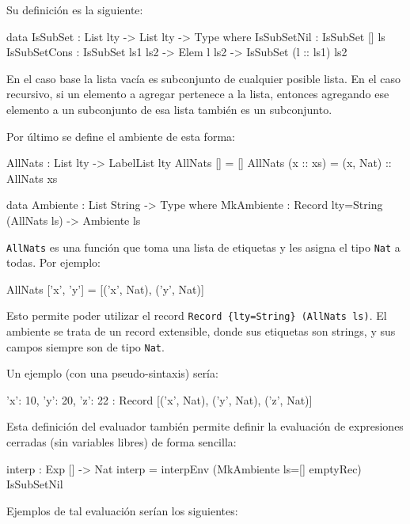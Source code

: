 Su definición es la siguiente:

\begin{code}
data IsSubSet : List lty -> List lty -> Type where
  IsSubSetNil : IsSubSet [] ls
  IsSubSetCons : IsSubSet ls1 ls2 -> Elem l ls2 -> 
    IsSubSet (l :: ls1) ls2
\end{code}

En el caso base la lista vacía es subconjunto de cualquier posible lista. En el caso recursivo, si un elemento a agregar pertenece a la lista, entonces agregando ese elemento a un subconjunto de esa lista también es un subconjunto.

Por último se define el ambiente de esta forma:

\begin{code}
AllNats : List lty -> LabelList lty
AllNats [] = []
AllNats (x :: xs) = (x, Nat) :: AllNats xs

data Ambiente : List String -> Type where
  MkAmbiente : Record {lty=String} (AllNats ls) -> Ambiente ls
\end{code}

\texttt{AllNats} es una función que toma una lista de etiquetas y les asigna el tipo \texttt{Nat} a todas. Por ejemplo:

\begin{code}
AllNats ['x', 'y'] = [('x', Nat), ('y', Nat)]
\end{code}

Esto permite poder utilizar el record \texttt{Record \{lty=String\} (AllNats ls)}. El ambiente se trata de un record extensible, donde sus etiquetas son strings, y sus campos siempre son de tipo \texttt{Nat}.

Un ejemplo (con una pseudo-sintaxis) sería:

\begin{code}
{ 'x': 10, 'y': 20, 'z': 22 } : 
  Record [('x', Nat), ('y', Nat), ('z', Nat)]
\end{code}

Esta definición del evaluador también permite definir la evaluación de expresiones cerradas (sin variables libres) de forma sencilla:

\begin {code}
interp : Exp [] -> Nat
interp = interpEnv (MkAmbiente {ls=[]} emptyRec) IsSubSetNil
\end{code}

Ejemplos de tal evaluación serían los siguientes:


